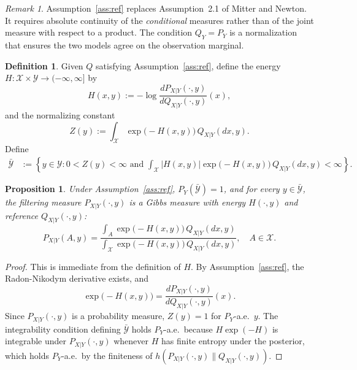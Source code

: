 \documentclass[12pt]{amsart}
\newtheorem{proposition}[theorem]{Proposition}
\theoremstyle{definition}
\newtheorem{definition}[theorem]{Definition}
\theoremstyle{remark}
\newtheorem{remark}{Remark}
\begin{document}
\begin{remark}
    Assumption~\ref{ass:ref} replaces Assumption~2.1 of Mitter and Newton. It requires absolute continuity of the \emph{conditional} measures rather than of the joint measure with respect to a product. The condition $Q_Y = P_Y$ is a normalization that ensures the two models agree on the observation marginal.
\end{remark}

\begin{definition}\label{def:energy}
    Given $Q$ satisfying Assumption~\ref{ass:ref}, define the energy $H : \mathcal{X} \times \mathcal{Y} \to (-\infty, \infty]$ by
    \[
        H(x, y) := -\log \frac{dP_{X|Y}(\cdot, y)}{dQ_{X|Y}(\cdot, y)}(x),
    \]
    and the normalizing constant
    \[
        Z(y) := \int_{\mathcal{X}} \exp\bigl(-H(x, y)\bigr) \, Q_{X|Y}(dx, y).
    \]
    Define
    \begin{align*}
        \bar{\mathcal{Y}} &:= \left\{ y \in \mathcal{Y} : 0 < Z(y) < \infty \text{ and } \int_{\mathcal{X}} |H(x,y)| \exp\bigl(-H(x,y)\bigr) \, Q_{X|Y}(dx, y) < \infty \right\}.
    \end{align*}
\end{definition}

\begin{proposition}\label{prop:gibbs}
    Under Assumption~\ref{ass:ref}, $P_Y(\bar{\mathcal{Y}}) = 1$, and for every $y \in \bar{\mathcal{Y}}$, the filtering measure $P_{X|Y}(\cdot, y)$ is a Gibbs measure with energy $H(\cdot, y)$ and reference $Q_{X|Y}(\cdot, y)$:
    \[
        P_{X|Y}(A, y) = \frac{\int_A \exp\bigl(-H(x, y)\bigr) \, Q_{X|Y}(dx, y)}{\int_{\mathcal{X}} \exp\bigl(-H(x, y)\bigr) \, Q_{X|Y}(dx, y)}, \quad A \in \mathcal{X}.
    \]
\end{proposition}

\begin{proof}
    This is immediate from the definition of $H$. By Assumption~\ref{ass:ref}, the Radon-Nikodym derivative exists, and
    \[
        \exp\bigl(-H(x, y)\bigr) = \frac{dP_{X|Y}(\cdot, y)}{dQ_{X|Y}(\cdot, y)}(x).
    \]
    Since $P_{X|Y}(\cdot, y)$ is a probability measure, $Z(y) = 1$ for $P_Y$-a.e.\ $y$. The integrability condition defining $\bar{\mathcal{Y}}$ holds $P_Y$-a.e.\ because $H \exp(-H)$ is integrable under $P_{X|Y}(\cdot, y)$ whenever $H$ has finite entropy under the posterior, which holds $P_Y$-a.e.\ by the finiteness of $h(P_{X|Y}(\cdot, y) \| Q_{X|Y}(\cdot, y))$.
\end{proof}
\end{document}
